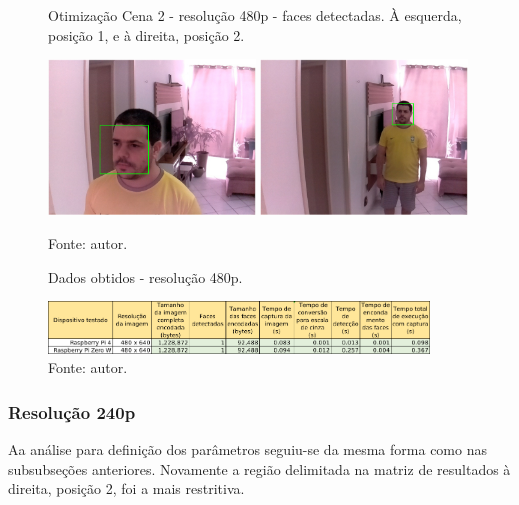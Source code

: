 \begin{figure}[H]
    \centering
    \caption[Otimização Cena 2 - resolução 480p - faces detectadas. À esquerda posição 1 e à direita, posição 2]{Otimização Cena 2 - resolução 480p - faces detectadas. À esquerda, posição 1, e à direita, posição 2.}
    \includegraphics[width=0.49\textwidth]{Cap4_Experimentos_Realizados/Figures/cena2_640x480_pos1_face.jpg}
    \includegraphics[width=0.49\textwidth]{Cap4_Experimentos_Realizados/Figures/cena2_640x480_pos2_face.jpg}
    \caption*{Fonte: autor.}
    \label{fig:otimizacaoCena2_480p_faces}
\end{figure}

\begin{figure}[H]
    \centering
    \caption[Dados obtidos - resolução 480p.]{Dados obtidos - resolução 480p.}
    \includegraphics[width=0.90\textwidth]{Cap4_Experimentos_Realizados/Figures/cena2_dados_480p_br.jpg}
    \caption*{Fonte: autor.}
    \label{fig:dadosCena2_480p}
\end{figure}

\subsubsection{Resolução 240p} \label{sssec:resolution2-3}

Aa análise para definição dos parâmetros seguiu-se da mesma forma como nas subsubseções anteriores. Novamente a região delimitada na matriz de resultados à direita, posição 2, foi a mais restritiva.

